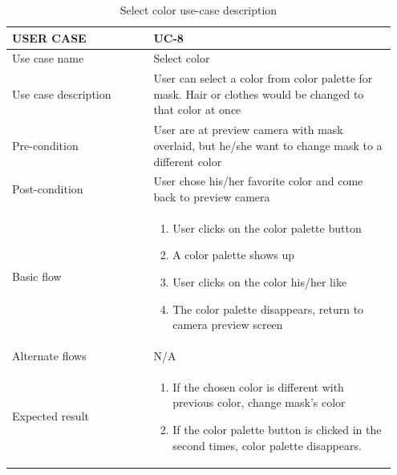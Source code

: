 \begin{center}
\begin{table} [H]
\caption{Select color use-case description} 
\begin{tabular}{p{0.35\linewidth} | p{0.6\linewidth}}
\hline
USER CASE            & UC-8 \\ \hline
Use case name        &  Select color  \\ \hline
Use case description &   User can select a color from color palette for mask. Hair or clothes would be changed to that color at once   \\\hline
Pre-condition         &   User are at preview camera with mask overlaid, but he/she want to change mask to a different color   \\ \hline
Post-condition        &   User chose his/her favorite color and come back to preview camera    \\ \hline
Basic flow           &  \begin{enumerate}
    \item 	User clicks on the color palette button
\item	A color palette shows up 
\item User clicks on the color his/her like
\item The color palette disappears, return to camera preview screen
\end{enumerate}    \\ \hline
Alternate flows      &   N/A   \\ \hline
Expected result      &  \begin{enumerate}
    \item 	If the chosen color is different with previous color, change mask’s color
\item If the color palette button is clicked in the second times, color palette disappears.
\end{enumerate}    \\ \hline
\end{tabular}
\end{table}
\end{center}


